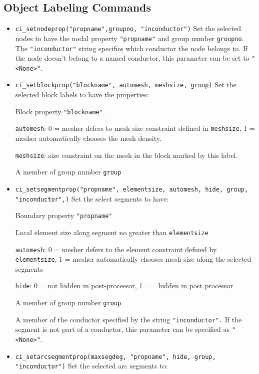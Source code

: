 \subsection{Object Labeling Commands}

\begin{itemize}
\item {\tt ci\_setnodeprop("propname",groupno, "inconductor")} Set the selected
nodes to have the nodal property \texttt{"propname"} and group
number \texttt{groupno}. The \texttt{"inconductor"} string
specifies which conductor the node belongs to. If the node doesn't
belong to a named conductor, this parameter can be set to
\texttt{"<None>"}.

\item {\tt ci\_setblockprop("blockname", automesh, meshsize, group)} Set the
selected block labels to have the properties:

Block property \texttt{"blockname"}.

\texttt{automesh}: 0 = mesher defers to mesh size constraint defined in
\texttt{meshsize}, 1 = mesher automatically chooses the mesh density.

\texttt{meshsize}: size constraint on the mesh in the block marked by this
label.

A member of group number \texttt{group}

\item {\tt ci\_setsegmentprop("propname", elementsize, automesh, hide, group,
"inconductor",)} Set the select segments to have:

Boundary property \texttt{"propname"}

Local element size along segment no greater than
\texttt{elementsize}

\texttt{automesh}: 0 = mesher defers to the element constraint defined by
\texttt{elementsize}, 1 = mesher automatically chooses mesh size along the
selected segments

\texttt{hide}: 0 = not hidden in post-processor, 1 == hidden in post
processor

A member of group number \texttt{group}

A member of the conductor specified by the string
\texttt{"inconductor".} If the segment is not part of a conductor,
this parameter can be specified as
\texttt{"<None>"}.

\item {\tt ci\_setarcsegmentprop(maxsegdeg, "propname", hide, group,
"inconductor")} Set the selected arc segments to:


\end{itemize}
